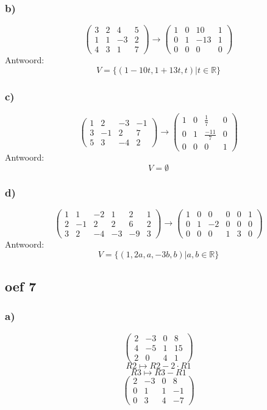 \documentclass[10pt,a4paper]{article}
\begin{document}
\subsubsection*{b)}
\[
\begin{pmatrix}
3 &  2 &  4 &  5\\
1 &  1 & -3 &  2\\
4 &  3 &  1 &  7
\end{pmatrix}
\longrightarrow
\begin{pmatrix}
1 &  0 & 10 &  1\\
0 &  1 & -13&  1\\
0 &  0 &  0 &  0
\end{pmatrix}
\]
Antwoord:
\[
V=\{(1-10t,1+13t,t) | t \in \mathbb{R}\}
\]

\subsubsection*{c)}
\[
\begin{pmatrix}
1 &  2 & -3 & -1\\
3 & -1 &  2 &  7\\
5 &  3 & -4 &  2
\end{pmatrix}
\longrightarrow
\begin{pmatrix}
1 &  0 & \frac{1}{7} &  0\\
0 &  1 & \frac{-11}{7}&  0\\
0 &  0 &  0 &  1
\end{pmatrix}
\]
Antwoord:
\[
V=\emptyset
\]

\subsubsection*{d)}
\[
\begin{pmatrix}
1 &  1 & -2 &  1 &  2 & 1\\
2 & -1 &  2 &  2 &  6 & 2\\
3 &  2 & -4 & -3 & -9 & 3
\end{pmatrix}
\longrightarrow
\begin{pmatrix}
1 &  0 &  0 &  0 &  0 & 1\\
0 &  1 & -2 &  0 &  0 & 0\\
0 &  0 &  0 &  1 &  3 & 0
\end{pmatrix}
\]
Antwoord:
\[
V=\{(1,2a,a,-3b,b) | a,b \in \mathbb{R} \}
\]

\subsection*{oef 7}
\subsubsection*{a)}
\[
\begin{pmatrix}
2 & -3 & 0 & 8\\
4 & -5 & 1 & 15\\
2 & 0 & 4 & 1
\end{pmatrix}
\]
\[ R2 \longmapsto R2 - 2\cdot R1\]
\[ R3 \longmapsto R3 -  R1\]
\[
\begin{pmatrix}
2 & -3 & 0 & 8\\
0 & 1 & 1 & -1\\
0 & 3 & 4 & -7
\end{pmatrix}
\]
\end{document}
